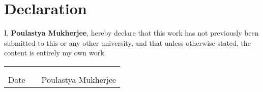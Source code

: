 \clearpage
\section*{Declaration}

\renewcommand{\arraystretch}{0.4}

\vspace{20mm}

I, \textbf{Poulastya Mukherjee}, %
hereby declare that this work has not previously been submitted to this or any other university, and that unless otherwise stated, the content is entirely my own work.


\vspace{150mm}

\begin{table}[h]
 \begin{center}
  \begin{tabular}{ccc}
   
   \hspace{30mm}  & \hspace{30mm} &  \hspace{50mm} \\
   \cline{1-1}    \cline{3-3} \\
   Date           &  & Poulastya Mukherjee\\
  \end{tabular}
 \end{center}
\end{table}

\clearpage

